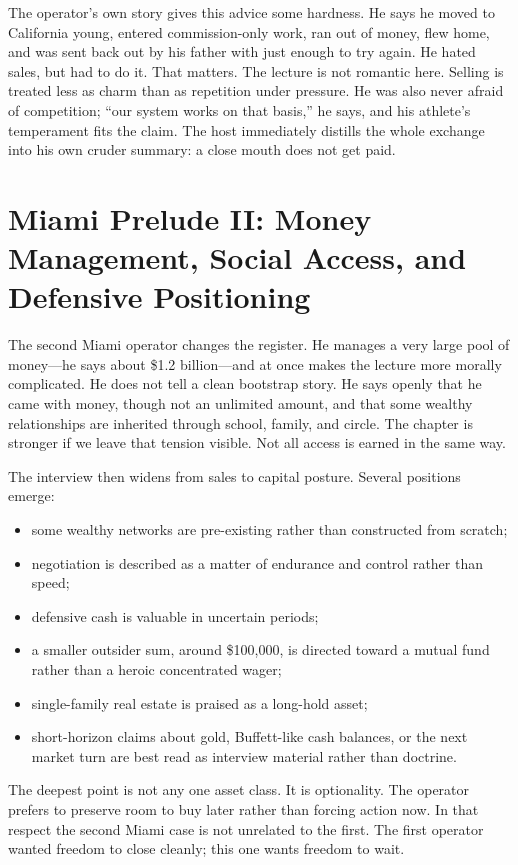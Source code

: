 The operator's own story gives this advice some hardness. He says he moved to California young, entered commission-only work, ran out of money, flew home, and was sent back out by his father with just enough to try again. He hated sales, but had to do it. That matters. The lecture is not romantic here. Selling is treated less as charm than as repetition under pressure. He was also never afraid of competition; ``our system works on that basis,'' he says, and his athlete's temperament fits the claim. The host immediately distills the whole exchange into his own cruder summary: a close mouth does not get paid.

\section{Miami Prelude II: Money Management, Social Access, and Defensive Positioning}

The second Miami operator changes the register. He manages a very large pool of money---he says about \$1.2 billion---and at once makes the lecture more morally complicated. He does not tell a clean bootstrap story. He says openly that he came with money, though not an unlimited amount, and that some wealthy relationships are inherited through school, family, and circle. The chapter is stronger if we leave that tension visible. Not all access is earned in the same way.

The interview then widens from sales to capital posture. Several positions emerge:
\begin{itemize}
\item some wealthy networks are pre-existing rather than constructed from scratch;
\item negotiation is described as a matter of endurance and control rather than speed;
\item defensive cash is valuable in uncertain periods;
\item a smaller outsider sum, around \$100{,}000, is directed toward a mutual fund rather than a heroic concentrated wager;
\item single-family real estate is praised as a long-hold asset;
\item short-horizon claims about gold, Buffett-like cash balances, or the next market turn are best read as interview material rather than doctrine.
\end{itemize}

The deepest point is not any one asset class. It is optionality. The operator prefers to preserve room to buy later rather than forcing action now. In that respect the second Miami case is not unrelated to the first. The first operator wanted freedom to close cleanly; this one wants freedom to wait.

